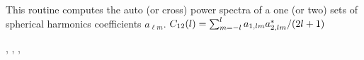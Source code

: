 
\sloppy


\section[alm2cl*]{ }
\label{sub:alm2cl}
\author{Eric Hivon}

\begin{facility}
{This routine computes the auto (or cross) power spectra of a one (or two) sets of spherical harmonics
  coefficients $a_{\ell m}$.
$C_{12}(l) = \sum_{m=-l}^{l} a_{1,l m}
  a_{2,l m}^* / (2 l +1) $ }
{\modAlmTools}
\end{facility}

\begin{f90format}
{%
, %
, %
,  %
}
\end{f90format}
\aboutoptional

